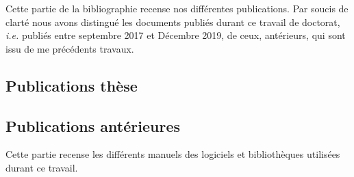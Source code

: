 \label{refs:biblio}
\printbibliography[heading=none, notkeyword={software}]


\label{ref:publi}

Cette partie de la bibliographie recense nos différentes
publications. Par soucis de clarté nous avons distingué les documents
publiés durant ce travail de doctorat, \emph{i.e.} publiés entre
septembre 2017 et Décembre 2019, de ceux, antérieurs, qui sont issu de
me précédents travaux.

\subsection*{Publications thèse}
\label{ref:publi:ths}

\begin{refsection}
  \nocite{Bunel2019,Bunel2019a,Bunel2019b,Bunel2018a,Bunel2018b}
  \newrefcontext[sorting=ynt]
  \printbibliography[heading=none]
\end{refsection}

\subsection*{Publications antérieures}
\label{ref:publi:av}

\begin{refsection}
  \nocite{Ducruet2017a,Bunel2017,Ducruet2017,
    Wang2017,Bunel2017a, Berli2018,Bunel2016,Ducruet2017b}
        \printbibliography[heading=none]
\end{refsection}

\label{ref:software}

Cette partie recense les différents manuels des logiciels et
bibliothèques utilisées durant ce travail.

\begin{refsection}
  \nocite{Perez2007,Hunter2007,vanderWalt2011,
    vanderWalt2014,CGAL2019,Virtanen2020}
  \printbibliography[heading=none, keyword={software}]
\end{refsection}
